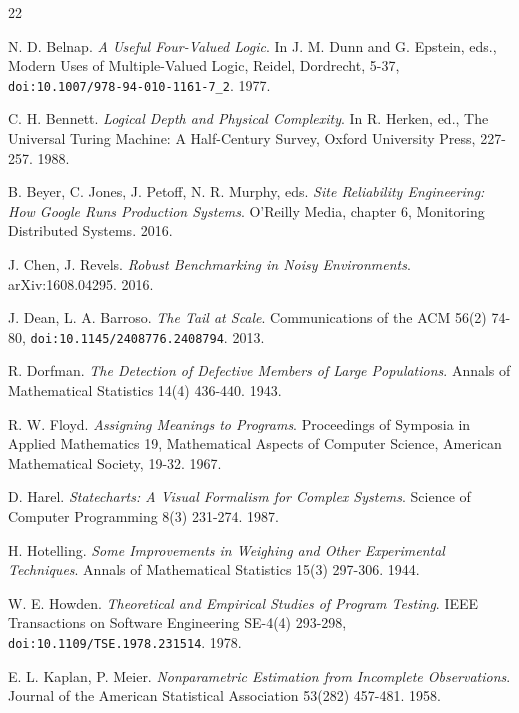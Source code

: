 \backmatter
{}
\begin{thebibliography}{22}

N. D. Belnap. \emph{A Useful Four-Valued Logic}. In J. M. Dunn and G. Epstein, eds., Modern Uses of Multiple-Valued Logic, Reidel, Dordrecht, 5-37, \texttt{doi:10.1007/\allowbreak{}978-94-010-1161-7\_2}. 1977.

C. H. Bennett. \emph{Logical Depth and Physical Complexity}. In R. Herken, ed., The Universal Turing Machine: A Half-Century Survey, Oxford University Press, 227-257. 1988.

B. Beyer, C. Jones, J. Petoff, N. R. Murphy, eds. \emph{Site Reliability Engineering: How Google Runs Production Systems}. O'Reilly Media, chapter 6, Monitoring Distributed Systems. 2016.

J. Chen, J. Revels. \emph{Robust Benchmarking in Noisy Environments}. arXiv:1608.04295. 2016.

J. Dean, L. A. Barroso. \emph{The Tail at Scale}. Communications of the ACM 56(2) 74-80, \texttt{doi:10.1145/\allowbreak{}2408776.2408794}. 2013.

R. Dorfman. \emph{The Detection of Defective Members of Large Populations}. Annals of Mathematical Statistics 14(4) 436-440. 1943.

R. W. Floyd. \emph{Assigning Meanings to Programs}. Proceedings of Symposia in Applied Mathematics 19, Mathematical Aspects of Computer Science, American Mathematical Society, 19-32. 1967.

D. Harel. \emph{Statecharts: A Visual Formalism for Complex Systems}. Science of Computer Programming 8(3) 231-274. 1987.

H. Hotelling. \emph{Some Improvements in Weighing and Other Experimental Techniques}. Annals of Mathematical Statistics 15(3) 297-306. 1944.

W. E. Howden. \emph{Theoretical and Empirical Studies of Program Testing}. IEEE Transactions on Software Engineering SE-4(4) 293-298, \texttt{doi:10.1109/\allowbreak{}TSE.1978.231514}. 1978.

E. L. Kaplan, P. Meier. \emph{Nonparametric Estimation from Incomplete Observations}. Journal of the American Statistical Association 53(282) 457-481. 1958.


\end{thebibliography}
